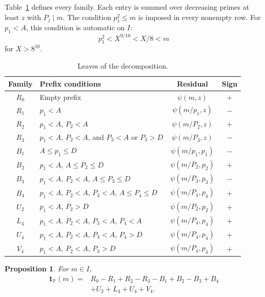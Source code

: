 \documentclass{amsart}
\newtheorem{proposition}[lemma]{Proposition}
\numberwithin{equation}{section}
\numberwithin{table}{section}
\newcommand{\PP}{\mathbb P}
\newcommand{\ind}{\mathbf 1}
\begin{document}
Table~\ref{tab:families} defines every family. Each entry is summed over
decreasing primes at least $z$ with $P_j\mid m$. The condition
$p_1^2\le m$ is imposed in every nonempty row.
For $p_1<A$, this condition is automatic on $I$:
\begin{equation}\label{eq:C1-automatic}
p_1^2<X^{9/10}<X/8<m
\end{equation}
for $X>8^{10}$.

\begin{table}[htbp]
\caption{Leaves of the decomposition.}\label{tab:families}
\centering\small
\renewcommand{\arraystretch}{1.18}
\begin{tabular}{@{}c p{} c c@{}}
Family&Prefix conditions&Residual&Sign\\ \hline
$R_0$&Empty prefix&$\psi(m,z)$&$+$\\
$R_1$&$p_1<A$&$\psi(m/p_1,z)$&$-$\\
$R_2$&$p_1<A$, $P_2<A$&$\psi(m/P_2,z)$&$+$\\
$R_3$&$p_1<A$, $P_2<A$, and $P_3<A$ or $P_3>D$
&$\psi(m/P_3,z)$&$-$\\
$B_1$&$A\le p_1\le D$&$\psi(m/p_1,p_1)$&$-$\\
$B_2$&$p_1<A$, $A\le P_2\le D$&$\psi(m/P_2,p_2)$&$+$\\
$B_3$&$p_1<A$, $P_2<A$, $A\le P_3\le D$
&$\psi(m/P_3,p_3)$&$-$\\
$B_4$&$p_1<A$, $P_2<A$, $P_3<A$, $A\le P_4\le D$
&$\psi(m/P_4,p_4)$&$+$\\ \hline
$U_2$&$p_1<A$, $P_2>D$&$\psi(m/P_2,p_2)$&$+$\\
$L_4$&$p_1<A$, $P_2<A$, $P_3<A$, $P_4<A$
&$\psi(m/P_4,p_4)$&$+$\\
$U_4$&$p_1<A$, $P_2<A$, $P_3<A$, $P_4>D$
&$\psi(m/P_4,p_4)$&$+$\\
$V_4$&$p_1<A$, $P_2<A$, $P_3>D$
&$\psi(m/P_4,p_4)$&$+$\\ \hline
\end{tabular}
\end{table}

\begin{proposition}\label{prop:tree-identity}
For $m\in I$,
\begin{equation}\label{eq:tree-identity}
\begin{split}
\ind_{\PP}(m)={}&R_0-R_1+R_2-R_3-B_1+B_2-B_3+B_4\\
&+U_2+L_4+U_4+V_4.
\end{split}
\end{equation}
\end{proposition}
\end{document}
